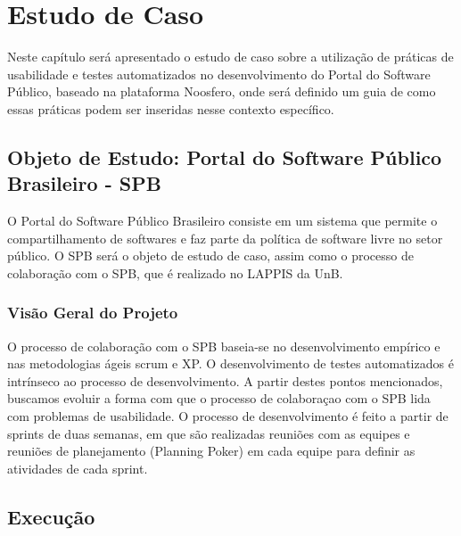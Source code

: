 \chapter{Estudo de Caso}

Neste capítulo será apresentado o estudo de caso sobre a utilização de práticas de usabilidade e testes automatizados no desenvolvimento do Portal do Software Público, baseado na plataforma Noosfero, onde será definido um guia de como essas práticas podem ser inseridas nesse contexto específico.

\section{Objeto de Estudo: Portal do Software Público Brasileiro - SPB}

O Portal do Software Público Brasileiro consiste em um sistema que permite o compartilhamento de softwares e faz parte da política de software livre no setor público.
O SPB será o objeto de estudo de caso, assim como o processo de colaboração com o SPB, que é realizado no LAPPIS da UnB.

\subsection{Visão Geral do Projeto}

O processo de colaboração com o SPB baseia-se no desenvolvimento empírico e nas metodologias ágeis scrum e XP. O desenvolvimento de testes automatizados é intrínseco ao processo de desenvolvimento. A partir destes pontos mencionados, buscamos evoluir a forma com que o processo de colaboraçao com o SPB lida com problemas de usabilidade.
O processo de desenvolvimento é feito a partir de sprints de duas semanas, em que são realizadas reuniões com as equipes e reuniões de planejamento (Planning Poker) em cada equipe para definir as atividades de cada sprint.



 
\section{Execução}

